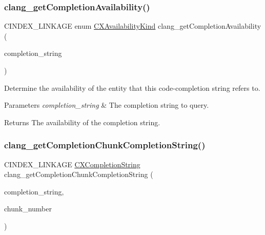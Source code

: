 \subsubsection{\texorpdfstring{clang\+\_\+get\+Completion\+Availability()}{clang\_getCompletionAvailability()}}
{\footnotesize\ttfamily C\+I\+N\+D\+E\+X\+\_\+\+L\+I\+N\+K\+A\+GE enum \hyperlink{group__CINDEX_gada331ea0195e952c8f181ecf15e83d71}{C\+X\+Availability\+Kind} clang\+\_\+get\+Completion\+Availability (\begin{DoxyParamCaption}\item[{\hyperlink{group__CINDEX__CODE__COMPLET_gafea23a43a60ec3b4f3bedccfbb76883a}{C\+X\+Completion\+String}}]{completion\+\_\+string }\end{DoxyParamCaption})}



Determine the availability of the entity that this code-\/completion string refers to. 


\begin{DoxyParams}{Parameters}
{\em completion\+\_\+string} & The completion string to query.\\
\hline
\end{DoxyParams}
\begin{DoxyReturn}{Returns}
The availability of the completion string. 
\end{DoxyReturn}
\mbox{\label{group__CINDEX__CODE__COMPLET_ga3063e36e81b3e14809f87bdc841a3a9d}} 
\subsubsection{\texorpdfstring{clang\+\_\+get\+Completion\+Chunk\+Completion\+String()}{clang\_getCompletionChunkCompletionString()}}
{\footnotesize\ttfamily C\+I\+N\+D\+E\+X\+\_\+\+L\+I\+N\+K\+A\+GE \hyperlink{group__CINDEX__CODE__COMPLET_gafea23a43a60ec3b4f3bedccfbb76883a}{C\+X\+Completion\+String} clang\+\_\+get\+Completion\+Chunk\+Completion\+String (\begin{DoxyParamCaption}\item[{\hyperlink{group__CINDEX__CODE__COMPLET_gafea23a43a60ec3b4f3bedccfbb76883a}{C\+X\+Completion\+String}}]{completion\+\_\+string,  }\item[{unsigned}]{chunk\+\_\+number }\end{DoxyParamCaption})}



